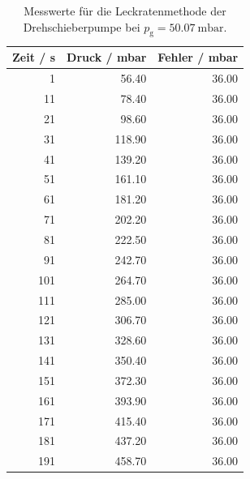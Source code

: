 \begin{table}[H]
  \centering
\caption{Messwerte für die Leckratenmethode der Drehschieberpumpe bei $p_\text{g} = \qty{50.07}{\milli\bar}$.}
\label{tab:13} 
\begin{tabular}{rrr}
\toprule
Zeit / s & Druck / mbar & Fehler / mbar \\
\midrule
1 & 56.40 & 36.00 \\
11 & 78.40 & 36.00 \\
21 & 98.60 & 36.00 \\
31 & 118.90 & 36.00 \\
41 & 139.20 & 36.00 \\
51 & 161.10 & 36.00 \\
61 & 181.20 & 36.00 \\
71 & 202.20 & 36.00 \\
81 & 222.50 & 36.00 \\
91 & 242.70 & 36.00 \\
101 & 264.70 & 36.00 \\
111 & 285.00 & 36.00 \\
121 & 306.70 & 36.00 \\
131 & 328.60 & 36.00 \\
141 & 350.40 & 36.00 \\
151 & 372.30 & 36.00 \\
161 & 393.90 & 36.00 \\
171 & 415.40 & 36.00 \\
181 & 437.20 & 36.00 \\
191 & 458.70 & 36.00 \\
\bottomrule
\end{tabular}
\end{table}

